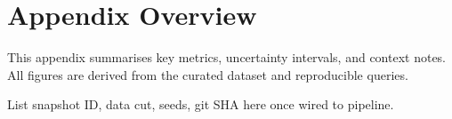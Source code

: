 \section{Appendix Overview}
This appendix summarises key metrics, uncertainty intervals, and context notes.
All figures are derived from the curated dataset and reproducible queries.

\begin{coachnotes}
List snapshot ID, data cut, seeds, git SHA here once wired to pipeline.
\end{coachnotes}
